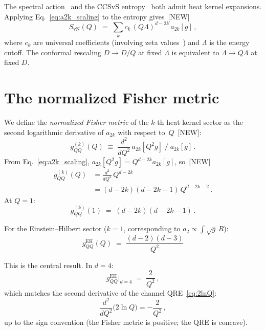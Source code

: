 \documentclass[prl,twocolumn,superscriptaddress,longbibliography]{revtex4-2}
\newcommand{\SvN}{S_{\mathrm{vN}}}
\begin{document}
The spectral action~\cite{CC1996} and the
CCSvS entropy~\cite{CCSvS2018} both admit heat kernel
expansions.
Applying Eq.~\eqref{eq:a2k_scaling} to the entropy
gives~[NEW]
\begin{equation}\label{eq:SvN_Q}
  \SvN(Q)
  \;=\;
  \sum_{k} c_k\, (Q\Lambda)^{d-2k}\, a_{2k}[g]\,,
\end{equation}
where $c_k$ are universal coefficients
(involving zeta values~\cite{CCSvS2018})
and $\Lambda$ is the energy cutoff.
The conformal rescaling $D \to D/Q$ at fixed $\Lambda$
is equivalent to $\Lambda \to Q\Lambda$ at fixed $D$.


\section{The normalized Fisher metric}
\label{sec:fisher}

We define the \emph{normalized Fisher metric} of the
$k$-th heat kernel sector as the second
logarithmic derivative of $a_{2k}$ with respect
to~$Q$~[NEW]:
\begin{equation}\label{eq:gQQ_def}
  g_{QQ}^{(k)}(Q)
  \;\equiv\;
  \frac{d^2}{dQ^2}\, a_{2k}[Q^2 g]
  \;\bigg/\;
  a_{2k}[g]\,.
\end{equation}
From Eq.~\eqref{eq:a2k_scaling},
$a_{2k}[Q^2 g] = Q^{d-2k} a_{2k}[g]$,
so~[NEW]
\begin{align}\label{eq:gQQ_formula}
  g_{QQ}^{(k)}(Q)
  &= \frac{d^2}{dQ^2}\, Q^{d-2k}
  \nonumber\\
  &= (d-2k)(d-2k-1)\, Q^{d-2k-2}\,.
\end{align}
At $Q=1$:
\begin{equation}\label{eq:gQQ_at1}
  g_{QQ}^{(k)}(1)
  \;=\; (d-2k)(d-2k-1)\,.
\end{equation}

For the Einstein--Hilbert sector ($k=1$,
corresponding to $a_2 \propto \int\!\sqrt{g}\, R$):
\begin{equation}\label{eq:gQQ_EH}
  \boxed{\;
  g_{QQ}^{\mathrm{EH}}(Q)
  \;=\;
  \frac{(d-2)(d-3)}{Q^2}
  \;}
\end{equation}

\noindent
This is the central result.
In $d=4$:
\begin{equation}\label{eq:gQQ_d4}
  g_{QQ}^{\mathrm{EH}}\big|_{d=4}
  \;=\; \frac{2}{Q^2}\,,
\end{equation}
which matches the second derivative of the channel
QRE~\eqref{eq:2lnQ}:
\begin{equation}
  \frac{d^2}{dQ^2}\bigl(2\ln Q\bigr)
  = -\frac{2}{Q^2}\,,
\end{equation}
up to the sign convention (the Fisher metric is
positive; the QRE is concave).
\end{document}
